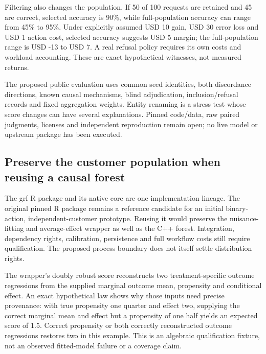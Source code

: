 Filtering also changes the population. If 50 of 100 requests are
retained and 45 are correct, selected accuracy is 90\%, while
full-population accuracy can range from 45\% to 95\%. Under explicitly
assumed USD 10 gain, USD 30 error loss and USD 1 action cost, selected
accuracy suggests USD 5 margin; the full-population range is USD -13 to
USD 7. A real refusal policy requires its own costs and workload
accounting. These are exact hypothetical witnesses, not measured
returns. \citep{exec21_causalitycheck_reference}

The proposed public evaluation uses common seed identities, both
discordance directions, known causal mechanisms, blind adjudication,
inclusion/refusal records and fixed aggregation weights. Entity renaming
is a stress test whose score changes can have several explanations.
Pinned code/data, raw paired judgments, licenses and independent
reproduction remain open; no live model or upstream package has been
executed. \citep{exec21_causalitycheck}

\hypertarget{preserve-the-customer-population-when-reusing-a-causal-forest}{%
\subsection{Preserve the customer population when reusing a causal
forest}\label{preserve-the-customer-population-when-reusing-a-causal-forest}}

The grf R package and its native core are one implementation lineage.
The original pinned R package remains a reference candidate for an
initial binary-action, independent-customer prototype. Reusing it would
preserve the nuisance-fitting and average-effect wrapper as well as the
C++ forest. Integration, dependency rights, calibration, persistence and
full workflow costs still require qualification. The proposed process
boundary does not itself settle distribution rights.
\citep{exec21_grf_reuse}

The wrapper's doubly robust score reconstructs two treatment-specific
outcome regressions from the supplied marginal outcome mean, propensity
and conditional effect. An exact hypothetical law shows why those inputs
need precise provenance: with true propensity one quarter and effect
two, supplying the correct marginal mean and effect but a propensity of
one half yields an expected score of 1.5. Correct propensity or both
correctly reconstructed outcome regressions restores two in this
example. This is an algebraic qualification fixture, not an observed
fitted-model failure or a coverage claim. \citep{exec21_grf_reference}

